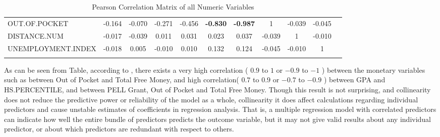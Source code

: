 \documentclass[12pt,english]{report}
\begin{document}
\begin{table}
{\begin{tabular}{@{\extracolsep{4pt}} lcccccccccc}
OUT.OF.POCKET      & -0.164         & -0.070 & -0.271                                                   & -0.456                                                  & \textbf{-0.830}                                       & \textbf{-0.987}                                             & 1                                                        & -0.039                                                  & -0.045                                                        \\
DISTANCE.NUM       & -0.017         & -0.039 & 0.011                                                    & 0.031                                                   & 0.023                                                 & 0.037                                                       & -0.039                                                   & 1                                                       & -0.010                                                        \\
UNEMPLOYMENT.INDEX & -0.018         & 0.005  & -0.010                                                   & 0.010                                                   & 0.132                                                 & 0.124                                                       & -0.045                                                   & -0.010                                                  & 1 \\ 
\hline \\[-1.8ex]                                                            
\end{tabular}}
\caption{Pearson Correlation Matrix of all Numeric Variables} 
  \label{correlation_matrix} 
\end{table}


As can be seen from Table, according to \citep{hinkle2003applied}, there exists a very high correlation ( $0.9$ to $1$ or $-0.9$ to $-1$ ) between the monetary variables such as between Out of Pocket and Total Free Money, and high correlation( $0.7$ to $0.9$ or $-0.7$ to $-0.9$ ) between GPA and HS.PERCENTILE, and between PELL Grant, Out of Pocket and Total Free Money.   Though this result is not surprising, and collinearity does not reduce the predictive power or reliability of the model as a whole, collinearity it does affect calculations regarding individual predictors and cause unstable estimates of coefficients in regression analysis. That is, a multiple regression model with correlated predictors can indicate how well the entire bundle of predictors predicts the outcome variable, but it may not give valid results about any individual predictor, or about which predictors are redundant with respect to others.
  
\end{document}
